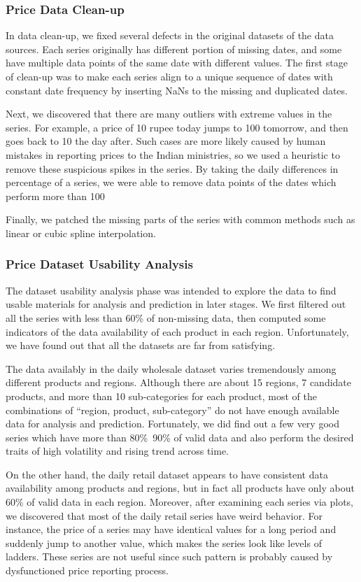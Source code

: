 \subsubsection*{Price Data Clean-up}
In data clean-up, we fixed several defects in the original datasets of the data sources. Each series originally has different portion of missing dates, and some have multiple data points of the same date with different values. The first stage of clean-up was to make each series align to a unique sequence of dates with constant date frequency by inserting NaNs to the missing and duplicated dates.

Next, we discovered that there are many outliers with extreme values in the series. For example, a price of 10 rupee today jumps to 100 tomorrow, and then goes back to 10 the day after. Such cases are more likely caused by human mistakes in reporting prices to the Indian ministries, so we used a heuristic to remove these suspicious spikes in the series. By taking the daily differences in percentage of a series, we were able to remove data points of the dates which perform more than 100%

Finally, we patched the missing parts of the series with common methods such as linear or cubic spline interpolation.

\subsubsection*{Price Dataset Usability Analysis}
The dataset usability analysis phase was intended to explore the data to find usable materials for analysis and prediction in later stages. We first filtered out all the series with less than 60\% of non-missing data, then computed some indicators of the data availability of each product in each region. Unfortunately, we have found out that all the datasets are far from satisfying.

The data availably in the daily wholesale dataset varies tremendously among different products and regions. Although there are about 15 regions, 7 candidate products, and more than 10 sub-categories for each product, most of the combinations of “region, product, sub-category” do not have enough available data for analysis and prediction. Fortunately, we did find out a few very good series which have more than 80\%~90\% of valid data and also perform the desired traits of high volatility and rising trend across time.

On the other hand, the daily retail dataset appears to have consistent data availability among products and regions, but in fact all products have only about 60\% of valid data in each region. Moreover, after examining each series via plots, we discovered that most of the daily retail series have weird behavior. For instance, the price of a series may have identical values for a long period and suddenly jump to another value, which makes the series look like levels of ladders. These series are not useful since such pattern is probably caused by dysfunctioned price reporting process.

